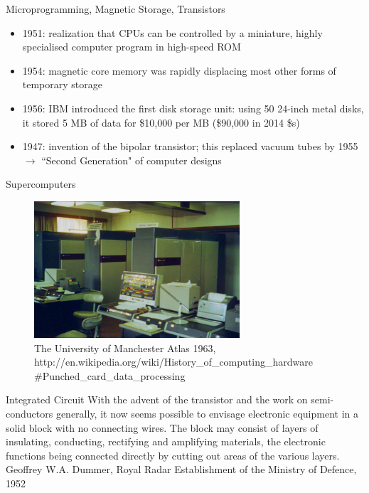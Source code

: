\documentclass[xcolor=x11names,compress]{beamer}
\renewcommand{\(}{\begin{columns}}
\renewcommand{\)}{\end{columns}}
\newcommand{\<}[1]{\begin{column}{#1}}
\renewcommand{\>}{\end{column}}
\begin{document}
\begin{frame}{Microprogramming, Magnetic Storage, Transistors}
\begin{itemize}
\item 1951: realization that CPUs can be controlled by a miniature, highly specialised computer program in high-speed ROM
\item 1954: magnetic core memory was rapidly displacing most other forms of temporary storage
\item 1956: IBM introduced the first disk storage unit: using 50 24-inch metal disks, it stored 5 MB of data for \$10,000 per MB (\$90,000 in 2014 \$s)
\item 1947: invention of the bipolar transistor; this replaced vacuum tubes by 1955 $\rightarrow$ ``Second Generation" of computer designs
\end{itemize}
\end{frame}

\begin{frame}{Supercomputers}

\begin{figure}
\includegraphics[height=2in,clip]{Atlas1963}
\caption{The University of Manchester Atlas 1963, http://en.wikipedia.org/wiki/History\_of\_computing\_hardware
\#Punched\_card\_data\_processing}
\end{figure}

\end{frame}

\begin{frame}{Integrated Circuit}
With the advent of the transistor and the work on semi-conductors generally, it now seems possible to envisage electronic equipment in a solid block with no connecting wires. The block may consist of layers of insulating, conducting, rectifying and amplifying materials, the electronic functions being connected directly by cutting out areas of the various layers.\\
\vspace*{1.5 em}
\hspace*{0.5 in}Geoffrey W.A. Dummer, Royal Radar Establishment of the Ministry of Defence, 1952

\end{frame}
\end{document}
